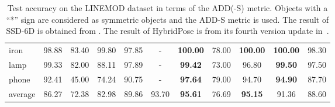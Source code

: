 \documentclass[10pt,twocolumn,letterpaper]{article}
\begin{document}
\begin{table*}[t]
\begin{center}
\begin{tabular}{l|cccccc|cccc}
iron & 98.88 & 83.40 & 99.80 & 97.85 & - & \textbf{100.00} & 78.00 & \textbf{100.00} & \textbf{100.00} & 98.30 \\
lamp & 99.33 & 82.00 & 88.11 & 97.89 & - & \textbf{99.42} & 73.00 & 96.80 & \textbf{99.50} & 97.50 \\
phone & 92.41 & 45.00 & 74.24 & 90.75 & - & \textbf{97.64} & 79.00 & 94.70 & \textbf{94.90} & 87.70 \\
\hline
average & 86.27 & 72.38 & 82.98 & 89.86 & 93.70 & \textbf{95.61} & 76.69 & \textbf{95.15} & 91.36 & 88.60 \\
\hline
 \end{tabular}
\end{center}
\caption{
Test accuracy on the LINEMOD dataset in terms of the ADD(-S) metric. Objects with a ``*'' sign are considered as symmetric objects and the ADD-S metric is used. The result of SSD-6D is obtained from \cite{tekin2018real}. The result of HybridPose is from its fourth version update in~\cite{song2020hybridposev4}.}
\label{tab:lm}
\end{table*}
\end{document}
